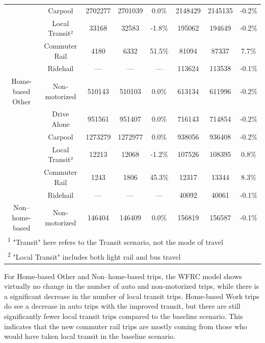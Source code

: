 \documentclass[fancy, oneside, mastersfancy, ms]{byuthesis}
\begin{document}
\begin{table}
{{\begin{tabular}[t]{cccccccc}
 & Carpool & 2702277 & 2701039 & 0.0\% & 2148429 & 2145135 & -0.2\%\\

 & Local Transit² & 33168 & 32583 & -1.8\% & 195062 & 194649 & -0.2\%\\

 & Commuter Rail & 4180 & 6332 & 51.5\% & 81094 & 87337 & 7.7\%\\

 & Ridehail & — & — & — & 113624 & 113538 & -0.1\%\\

\multirow{-6}{*}{\centering\arraybackslash Home-based Other} & Non-motorized & 510143 & 510103 & 0.0\% & 613134 & 611996 & -0.2\%\\
\cmidrule{1-8}
 & Drive Alone & 951561 & 951407 & 0.0\% & 716143 & 714854 & -0.2\%\\

 & Carpool & 1273279 & 1272977 & 0.0\% & 938056 & 936408 & -0.2\%\\

 & Local Transit² & 12213 & 12068 & -1.2\% & 107526 & 108395 & 0.8\%\\

 & Commuter Rail & 1243 & 1806 & 45.3\% & 12317 & 13344 & 8.3\%\\

 & Ridehail & — & — & — & 40092 & 40061 & -0.1\%\\

\multirow{-6}{*}{\centering\arraybackslash Non–home-based} & Non-motorized & 146404 & 146409 & 0.0\% & 156819 & 156587 & -0.1\%\\
\bottomrule
\multicolumn{8}{l}{\rule{0pt}{1em}\textsuperscript{1} "Transit" here refers to the Transit scenario, not the mode of travel}\\
\multicolumn{8}{l}{\rule{0pt}{1em}\textsuperscript{2} "Local Transit" includes both light rail and bus travel}\\
\end{tabular}}

}

\end{table}%

For Home-based Other and Non--home-based trips, the WFRC model shows
virtually no change in the number of auto and non-motorized trips, while
there is a significant decrease in the number of local transit trips.
Home-based Work trips do see a decrease in auto trips with the improved
transit, but there are still significantly fewer local transit trips
compared to the baseline scenario. This indicates that the new commuter
rail trips are mostly coming from those who would have taken local
transit in the baseline scenario.
\end{document}
